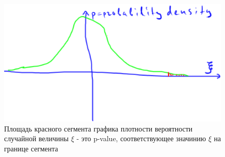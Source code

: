 \documentclass{book}
\begin{document}
\begin{figure}
    \centering
    \includegraphics[scale=.5]{img/p-value.png}
    \caption{Площадь красного сегмента графика плотности вероятности случайной величины $\xi$ - это p-value, соответствующее значинию $\xi$ на границе сегмента}
    \label{pval}
\end{figure}



 
\end{document}
